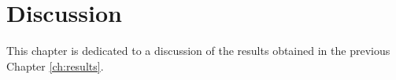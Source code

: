 \chapter{Discussion}
\label{ch:discussion}
This chapter is dedicated to a discussion of the results obtained in the previous Chapter \ref{ch:results}.